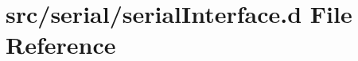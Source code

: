 \hypertarget{serial_interface_8d}{}\section{src/serial/serial\+Interface.d File Reference}
\label{serial_interface_8d}
